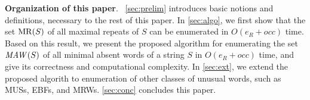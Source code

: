 
\textbf{Organization of this paper}.\ 
\cref{sec:prelim} introduces basic notions and definitions, necessary to the rest of this paper. 
In \cref{sec:algo}, we first show that the set $\mathrm{MR}(S)$ of all maximal repeats of $S$ can be enumerated in $O(e_R + occ)$ time. Based on this result, we present the proposed algorithm for enumerating the set $\MAW(S)$ of all minimal absent words of a string $S$ in $O(e_R + occ)$ time, and give its correctness and computational complexity. 
In \cref{sec:ext}, we extend the proposed algorith to enumeration of other classes of unusual words, such as MUSs, EBFs, and MRWs. 
\cref{sec:conc} concludes this paper. 



